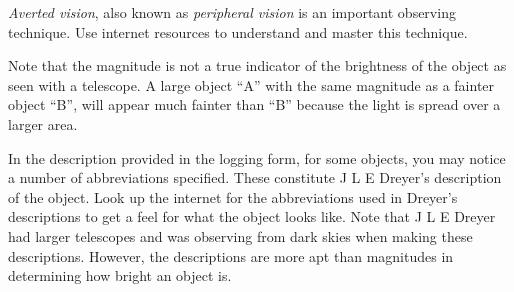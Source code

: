 \emph{Averted vision}, also known as \emph{peripheral vision} is an
important observing technique. Use internet resources to understand
and master this technique.

Note that the magnitude is not a true indicator of the brightness of
the object as seen with a telescope. A large object ``A'' with the
same magnitude as a fainter object ``B'', will appear much fainter
than ``B'' because the light is spread over a larger area.

In the description provided in the logging form, for some objects, you
may notice a number of abbreviations specified. These constitute J L E
Dreyer's description of the object. Look up the internet for the
abbreviations used in Dreyer's descriptions to get a feel for what the
object looks like. Note that J L E Dreyer had larger telescopes and
was observing from dark skies when making these descriptions. However,
the descriptions are more apt than magnitudes in determining how
bright an object is.

